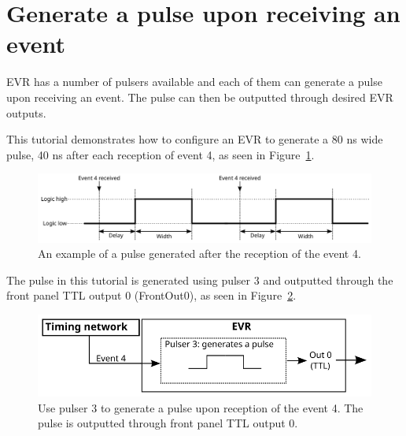\documentclass[12pt,a4paper]{article}
\begin{document}

\section{Generate a pulse upon receiving an event}
EVR has a number of pulsers available and each of them can generate a pulse upon receiving an event. The pulse can then be outputted through desired EVR outputs. 

This tutorial demonstrates how to configure an EVR to generate a 80 ns wide pulse, 40 ns after each reception of event 4, as seen in Figure~\ref{fig:pulser_signal}. 
\begin{figure}[H]
	\centering
	\includegraphics[width=\columnwidth]{./img/pulserSignal}
	\caption{An example of a pulse generated after the reception of the event 4.}
	\label{fig:pulser_signal}
\end{figure}
The pulse in this tutorial is generated using pulser 3 and outputted through the front panel TTL output 0 (FrontOut0), as seen in Figure~\ref{fig:pulser}. 

\begin{figure}[H]
	\centering
	\includegraphics[]{./img/pulser}
	\caption{Use pulser 3 to generate a pulse upon reception of the event 4. The pulse is outputted through front panel TTL output 0.}
	\label{fig:pulser}
\end{figure}
\end{document}
